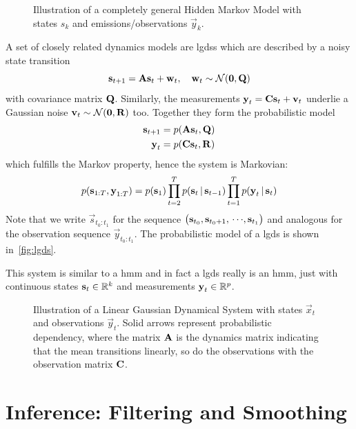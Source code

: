 	\begin{figure}
		\centering
		\tikzHiddenMarkovModel
		\caption{Illustration of a completely general Hidden Markov Model with states \(s_k\) and emissions/observations \(\vec{y}_k\).}
		\label{fig:hiddenMarkovModel}
	\end{figure}

	A set of closely related dynamics models are \acp{lgds} which are described by a noisy state transition
	\begin{equation*}
		\boldsymbol{\mathrm{s}}_{t + 1} = \boldsymbol{\mathrm{A}} \boldsymbol{\mathrm{s}}_t + \boldsymbol{\mathrm{w}}_t,\quad \boldsymbol{\mathrm{w}}_t \sim \mathcal{N}(\boldsymbol{\mathrm{0}}, \boldsymbol{\mathrm{Q}})
	\end{equation*}
	with covariance matrix \(\boldsymbol{\mathrm{Q}}\). Similarly, the measurements \( \boldsymbol{\mathrm{y}}_t = \boldsymbol{\mathrm{C}} \boldsymbol{\mathrm{s}}_t + \boldsymbol{\mathrm{v}}_t \) underlie a Gaussian noise \( \boldsymbol{\mathrm{v}}_t \sim \mathcal{N}(\boldsymbol{\mathrm{0}}, \boldsymbol{\mathrm{R}}) \) too. Together they form the probabilistic model
	\begin{align*}
		\boldsymbol{\mathrm{s}}_{t + 1} &= p(\boldsymbol{\mathrm{A}} \boldsymbol{\mathrm{s}}_t, \boldsymbol{\mathrm{Q}}) \\
		\boldsymbol{\mathrm{y}}_t &= p(\boldsymbol{\mathrm{C}} \boldsymbol{\mathrm{s}}_t, \boldsymbol{\mathrm{R}})
	\end{align*}
	which fulfills the Markov property, hence the system is Markovian:
	\begin{equation*}
		p(\boldsymbol{\mathrm{s}}_{1:T}, \boldsymbol{\mathrm{y}}_{1:T}) = p(\boldsymbol{\mathrm{s}}_1) \prod_{t = 2}^{T} p(\boldsymbol{\mathrm{s}}_t \,\vert\, \boldsymbol{\mathrm{s}}_{t - 1}) \prod_{t = 1}^{T} p(\boldsymbol{\mathrm{y}}_t \,\vert\, \boldsymbol{\mathrm{s}}_t)
	\end{equation*}
	Note that we write \( \vec{s}_{t_0:t_1} \) for the sequence \( \big( \boldsymbol{\mathrm{s}}_{t_0}, \boldsymbol{\mathrm{s}}_{t_0 + 1}, \,\cdots\!, \boldsymbol{\mathrm{s}}_{t_1} \big) \) and analogous for the observation sequence \( \vec{y}_{t_0:t_1} \). The probabilistic model of a \ac{lgds} is shown in~\autoref{fig:lgds}.

	This system is similar to a \ac{hmm} and in fact a \ac{lgds} really is an \ac{hmm}, just with continuous states \( \boldsymbol{\mathrm{s}}_t \in \mathbb{R}^k \) and measurements \( \boldsymbol{\mathrm{y}}_t \in \mathbb{R}^p \).

	\begin{figure}
		\centering
		\tikzLinearGaussianDynamicalSystem
		\caption{Illustration of a Linear Gaussian Dynamical System with states \(\vec{x}_t\) and observations \(\vec{y}_t\). Solid arrows represent probabilistic dependency, where the matrix \(\boldsymbol{\mathrm{A}}\) is the dynamics matrix indicating that the mean transitions linearly, so do the observations with the observation matrix \(\boldsymbol{\mathrm{C}}\).}
		\label{fig:lgds}
	\end{figure}

\section{Inference: Filtering and Smoothing}
	\label{sec:filteringSmoothing}

